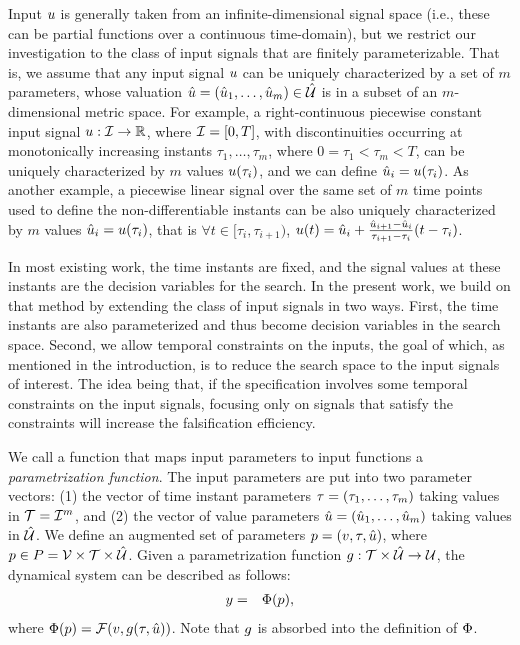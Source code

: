 Input $u$ is generally taken from an infinite-dimensional signal space (i.e., these can be partial functions over a continuous time-domain), but we restrict our investigation to the class of  input signals that are finitely parameterizable. That is, we assume that any input signal $u$ 
can be uniquely characterized by a set of $m$ parameters, whose valuation $\hat{u} =(\hat{u}_1,\ldots,\hat{u}_m) \in \hat{\mathcal{U}}$ is in a subset of an $m$-dimensional metric space. For example, a right-continuous piecewise constant input signal $u:\mathcal{I} \rightarrow \mathbb{R}$, where $\mathcal{I}=[ 0,T ]$, with discontinuities occurring at monotonically increasing instants $\tau_1,\ldots, \tau_m$, where $0=\tau_1<\tau_m<T$, can be uniquely characterized by $m$ values $u(\tau_i)$, and we can define $\hat{u}_i=u(\tau_i)$. As another example, a piecewise linear signal over the same set of $m$ time points used to define the non-differentiable instants can be also uniquely characterized by $m$ values $\hat{u}_i = u(\tau_i)$, that is $\forall t \in [\tau_i, \tau_{i+1})$, $u(t) = \hat{u}_i  + 
\frac{\hat{u}_{i+1} - \hat{u}_i}{\tau_{i+1} -  \tau_i}(t-\tau_i)$.

In most existing work, the time instants are fixed, and the signal values at these instants are the decision variables for the search. In the present work, we build on that method by extending the class of input signals in two ways. First, the time instants are also parameterized and thus become decision variables in the search space. Second, we allow temporal constraints on the inputs, the goal of which, as mentioned in the introduction, is to reduce the search space to the input signals of interest. The idea being that, if the specification involves some temporal constraints on the input signals, focusing only on signals that satisfy the constraints will increase the falsification efficiency. 

We call a function that maps input parameters to input functions a {\em parametrization function}. The input parameters are put into two parameter vectors: (1) the vector of time instant parameters $\tau = (\tau_1,\ldots, \tau_m)$ taking values in $\mathcal{T}=\mathcal{I}^m$, and (2) the vector of value parameters $\hat{u}= (\hat{u}_1, \ldots, \hat{u}_m)$ taking values in $\hat{\mathcal{U}}$. We define an augmented set of parameters $p = (v, \tau, \hat{u})$, where $p \in P = \mathcal{V} \times \mathcal{T}  \times \hat{\mathcal{U}}$. Given a parametrization function $g: \mathcal{T} \times \hat{\mathcal{U}} \rightarrow \mathcal{U}$, the dynamical system can be described as follows:
\begin{eqnarray} \label{eq:behaviorfunc}
y &=& \Phi(p),
\end{eqnarray}
where $\Phi(p) = \mathcal{F} (v, g(\tau, \hat{u}))$.  Note that $g$ is absorbed into the definition of $\Phi$.


